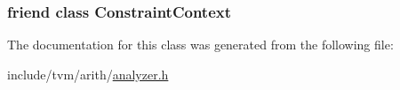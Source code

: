\subsubsection[{\texorpdfstring{Constraint\+Context}{ConstraintContext}}]{\setlength{\rightskip}{0pt plus 5cm}friend class {\bf Constraint\+Context}\hspace{0.3cm}{\ttfamily [friend]}}\hypertarget{classtvm_1_1arith_1_1ModularSetAnalyzer_ab8bf22547cf1df0a28fc4ee98841ab89}{}\label{classtvm_1_1arith_1_1ModularSetAnalyzer_ab8bf22547cf1df0a28fc4ee98841ab89}


The documentation for this class was generated from the following file\+:\begin{DoxyCompactItemize}
\item 
include/tvm/arith/\hyperlink{analyzer_8h}{analyzer.\+h}\end{DoxyCompactItemize}
